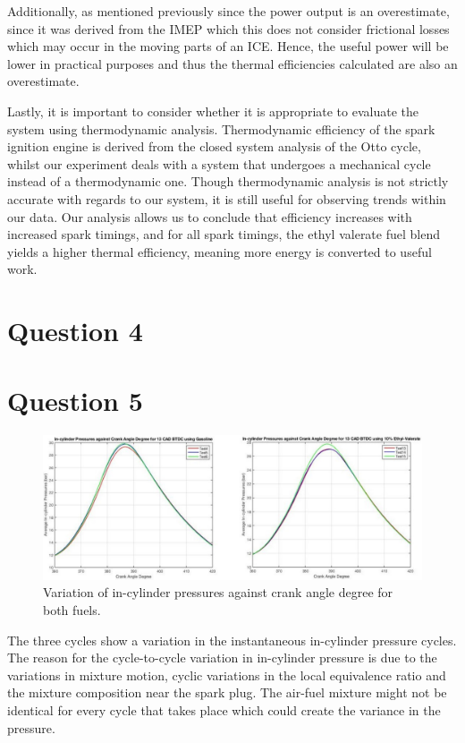 \documentclass[11pt]{article}
\begin{document}
Additionally, as mentioned previously since the power output is an overestimate, since it was derived from the IMEP which this does not consider frictional losses which may occur in the moving parts of an ICE. Hence, the useful power will be lower in practical purposes and thus the thermal efficiencies calculated are also an overestimate. 

Lastly, it is important to consider whether it is appropriate to evaluate the system using thermodynamic analysis. Thermodynamic efficiency of the spark ignition engine is derived from the closed system analysis of the Otto cycle, whilst our experiment deals with a system that undergoes a mechanical cycle instead of a thermodynamic one. Though thermodynamic analysis is not strictly accurate with regards to our system, it is still useful for observing trends within our data. Our analysis allows us to conclude that efficiency increases with increased spark timings, and for all spark timings, the ethyl valerate fuel blend yields a higher thermal efficiency, meaning more energy is converted to useful work.  
\section{Question 4}
\section{Question 5}
\begin{figure}[H]
    \centering
    \includegraphics[width = \textwidth]{./img/diagram3.png}
    \caption{Variation of in-cylinder pressures against crank angle degree for both fuels.}
    \label{q5-f1}
\end{figure}
The three cycles show a variation in the instantaneous in-cylinder pressure cycles. The reason for the cycle-to-cycle variation in in-cylinder pressure is due to the variations in mixture motion, cyclic variations in the local equivalence ratio and the mixture composition near the spark plug. The air-fuel mixture might not be identical for every cycle that takes place which could create the variance in the pressure.  
\end{document}
